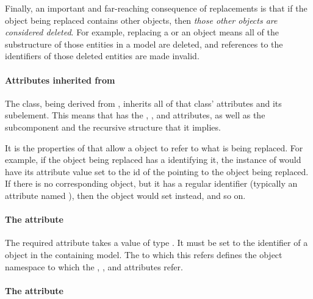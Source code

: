 Finally, an important and far-reaching consequence of replacements is
that if the object being replaced contains other objects, then
\emph{those other objects are considered deleted}.  For example,
replacing a \Reaction or an \Event object means all of the substructure
of those entities in a model are deleted, and references to the
identifiers of those deleted entities are made invalid.


\paragraph{Attributes inherited from }

The \ReplacedElement class, being derived from \SBaseRef, inherits all
of that class' attributes and its subelement.  This means that
\ReplacedElement has the , , 
and  attributes, as well as the subcomponent
 and the recursive structure that it implies.

It is the properties of \SBaseRef that allow a \ReplacedElement object
to refer to what is being replaced.  For example, if the object being
replaced has a \Port identifying it, the instance of \ReplacedElement would
have its  attribute value set to the id of the \Port pointing to 
the object being replaced.  If there is no corresponding \Port object, but
it has a regular identifier (typically an attribute named ), then
the \ReplacedElement object would set  instead, and so on.


\paragraph{The \hspace*{1pt} attribute}
\label{replacedelement-submodelref}

The required attribute  takes a value of type
.  It must be set to the identifier of a \Submodel
object in the containing model.  The \Model to which this \Submodel refers defines the object namespace to which the  , ,  and  attributes refer.


\paragraph{The \hspace*{1pt} attribute}
\label{replacedelement-identical}

